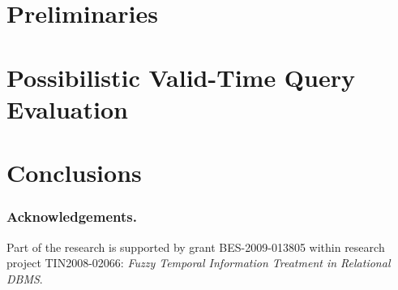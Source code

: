 \documentclass{llncs}
\begin{document}
\section{Preliminaries}
\label{sec:preliminaries}



\section{Possibilistic Valid-Time Query Evaluation}
\label{sec:proposal}


\section{Conclusions}
\label{sec:futher-research}

%




%
\subsubsection*{Acknowledgements.}
%
Part of the research is supported by grant BES-2009-013805 within research project TIN2008-02066: \emph{Fuzzy Temporal Information Treatment in Relational DBMS}.




\end{document}
